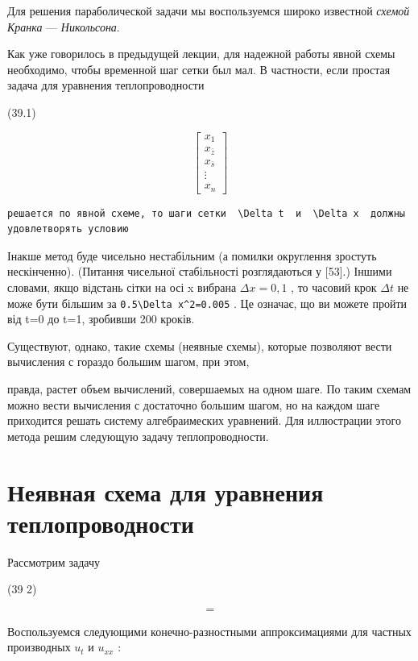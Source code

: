 \documentclass[
  ukrainian,
]{article}
\begin{document}
Для решения параболической задачи мы воспользуемся широко известной
\emph{схемой Кранка} --- \emph{Никольсона}.

Как уже говорилось в предыдущей лекции, для надежной работы явной схемы
необходимо, чтобы временной шаг сетки был мал. В частности, если простая
задача для уравнения теплопроводности

(39.1)

\[
\begin{bmatrix} x_1 \\ x_{\bar{z}} \\ x_{\bar{s}} \\ \vdots \\ x_n \end{bmatrix}
\]

\begin{verbatim}
решается по явной схеме, то шаги сетки  \Delta t  и  \Delta x  должны удовлетворять условию
\end{verbatim}

Інакше метод буде чисельно нестабільним (а помилки округлення зростуть
нескінченно). (Питання чисельної стабільності розглядаються у {[}53{]}.)
Іншими словами, якщо відстань сітки на осі x вибрана \(\Delta x=0,1\) ,
то часовий крок \(\Delta t\) не може бути більшим за
\texttt{0.5\textbackslash{}Delta\ x\^{}2=0.005} . Це означає, що ви
можете пройти від t=0 до t=1, зробивши 200 кроків.

Существуют, однако, такие схемы (неявные схемы), которые позволяют вести
вычисления с гораздо большим шагом, при этом,

правда, растет объем вычислений, совершаемых на одном шаге. По таким
схемам можно вести вычисления с достаточно большим шагом, но на каждом
шаге приходится решать систему алгебраимеских уравнений. Для иллюстрации
этого метода решим следующую задачу теплопроводности.

\section{Неявная схема для уравнения
теплопроводности}\label{ux43dux435ux44fux432ux43dux430ux44f-ux441ux445ux435ux43cux430-ux434ux43bux44f-ux443ux440ux430ux432ux43dux435ux43dux438ux44f-ux442ux435ux43fux43bux43eux43fux440ux43eux432ux43eux434ux43dux43eux441ux442ux438}

Рассмотрим задачу

(39 2)

\[
=
\]

Воспользуемся следующими конечно-разностными аппроксимациями для частных
производных \(u_t\) и \(u_{xx}\) :
\end{document}
